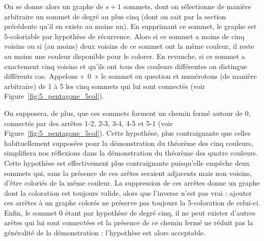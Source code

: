 On se donne alors un graphe de $s+1$ sommets, dont on sélectionne de manière arbitraire un sommet de degré au plus cinq (dont on sait par la section précédente qu'il en existe au moins un). En supprimant ce sommet, le graphe est 5-coloriable par hypothèse de récurrence. Alors si ce sommet a moins de cinq voisins ou si (au moins) deux voisins de ce sommet ont la même couleur, il reste au moins une couleur disponible pour le colorer. En revanche, si ce sommet a exactement cinq voisins et qu'ils ont tous des couleurs différentes on distingue différents cas. Appelons «~0~» le sommet en question et numérotons (de manière arbitraire) de 1 à 5 les cinq sommets qui lui sont connectés (voir Figure~\ref{fig:5_pentagone_5col}).

%	

On supposera, de plus, que ces sommets forment un chemin fermé autour de 0, connectés par des arrêtes 1-2, 2-3, 3-4, 4-5 et 5-1 (voir Figure~\ref{fig:5_pentagone_5col}). Cette hypothèse, plus contraignante que celles habituellement supposées pour la démonstration du théorème des cinq couleurs, simplifiera nos réflexions dans la démonstration du théorème des quatre couleurs. Cette hypothèse est effectivement plus contraignante puisqu'elle empêche deux sommets qui, sans la présence de ces arêtes seraient adjacents mais non voisins, d'être coloriés de la même couleur. La suppression de ces arrêtes donne un graphe dont la coloration est toujours valide, alors que l'inverse n'est pas vrai : ajouter ces arrêtes à un graphe colorés ne préserve pas toujours la 5-coloration de celui-ci. Enfin, le sommet 0 étant par hypothèse de degré cinq, il ne peut exister d'autres arêtes qui lui sont connectées et la présence de ce chemin fermé ne réduit pas la généralité de la démonstration : l'hypothèse est alors acceptable.


